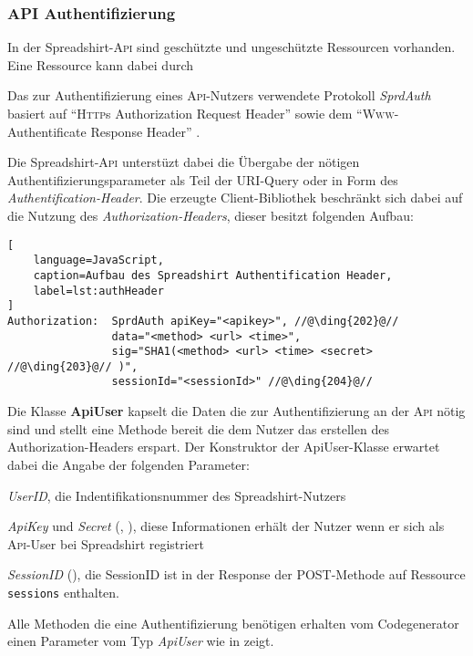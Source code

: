 \subsubsection{API Authentifizierung}
\label{sec:api_auth}

In der Spreadshirt-\textsc{Api} sind geschützte und ungeschützte Ressourcen vorhanden. Eine Ressource kann dabei durch 

Das zur Authentifizierung eines \textsc{Api}-Nutzers verwendete Protokoll \emph{SprdAuth} basiert auf \enquote{\textsc{Http}s Authorization Request Header} sowie dem \enquote{\textsc{Www}-Authentificate Response Header} \cite{apiSecurity}.

Die Spreadshirt-\textsc{Api} unterstüzt dabei die Übergabe der nötigen Authentifizierungsparameter als Teil der \gls{URI}-Query oder in Form des \emph{Authentification-Header}. Die erzeugte Client-Bibliothek beschränkt sich dabei auf die Nutzung des \emph{Authorization-Headers}, dieser besitzt folgenden Aufbau:

\begin{lstlisting}[
    language=JavaScript,
    caption=Aufbau des Spreadshirt Authentification Header,
    label=lst:authHeader
]
Authorization:  SprdAuth apiKey="<apikey>", //@\ding{202}@// 
                data="<method> <url> <time>", 
                sig="SHA1(<method> <url> <time> <secret> //@\ding{203}@// )", 
                sessionId="<sessionId>" //@\ding{204}@//
\end{lstlisting}

Die Klasse \textbf{ApiUser} kapselt die Daten die zur Authentifizierung an der \textsc{Api} nötig sind und stellt eine Methode bereit die dem Nutzer das erstellen des Authorization-Headers erspart. Der Konstruktor der ApiUser-Klasse erwartet dabei die Angabe der folgenden Parameter:

\begin{compactitem}
    \item \emph{UserID}, die Indentifikationsnummer des Spreadshirt-Nutzers
    \item \emph{ApiKey} und \emph{Secret} (, ), diese Informationen erhält der Nutzer wenn er sich als \textsc{Api}-User bei Spreadshirt registriert
    \item \emph{SessionID} (), die SessionID ist in der Response der POST-Methode auf Ressource \texttt{sessions} enthalten.
\end{compactitem}

Alle Methoden die eine Authentifizierung benötigen erhalten vom Codegenerator einen Parameter vom Typ \emph{ApiUser} wie  in  zeigt.